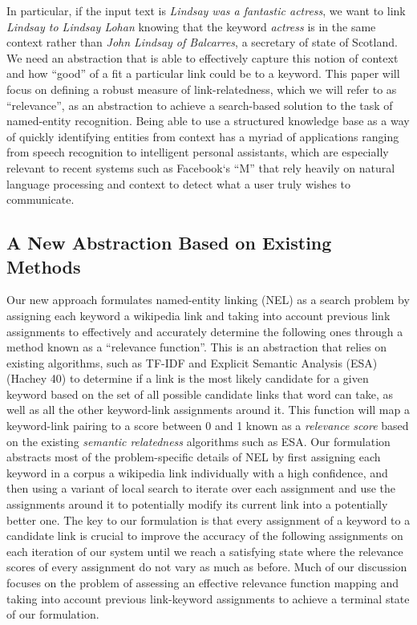 \documentclass[twoside,11pt]{article}
\begin{document}
In particular, if the input text is \textit{Lindsay was a fantastic actress}, we want to link \textit{Lindsay to Lindsay Lohan} knowing that the keyword \textit{actress} is in the same context rather than \textit{John Lindsay of Balcarres}, a secretary of state of Scotland. We need an abstraction that is able to effectively capture this notion of context and how ``good'' of a fit a particular link could be to a keyword. This paper will focus on defining a robust measure of link-relatedness, which we will refer to as ``relevance'', as an abstraction to achieve a search-based solution to the task of named-entity recognition. Being able to use a structured knowledge base as a way of quickly identifying entities from context has a myriad of applications ranging from speech recognition to intelligent personal assistants, which are especially relevant to recent systems such as Facebook`s ``M'' that rely heavily on natural language processing and context to detect what a user truly wishes to communicate.

\subsection{A New Abstraction Based on Existing Methods}


Our new approach formulates named-entity linking (NEL) as a search problem by assigning each keyword a wikipedia link and taking into account previous link assignments to effectively and accurately determine the following ones through a method known as a ``relevance function''. This is an abstraction that relies on existing algorithms, such as TF-IDF and Explicit Semantic Analysis (ESA) (Hachey 40) to determine if a link is the most likely candidate for a given keyword based on the set of all possible candidate links that word can take, as well as all the other keyword-link assignments around it. This function will map a keyword-link pairing to a score between 0 and 1 known as a \textit{relevance score} based on the existing \textit{semantic relatedness} algorithms such as ESA. Our formulation abstracts most of the problem-specific details of NEL by first assigning each keyword in a corpus a wikipedia link individually with a high confidence, and then using a variant of local search to iterate over each assignment and use the assignments around it to potentially modify its current link into a potentially better one. The key to our formulation is that every assignment of a keyword to a candidate link is crucial to improve the accuracy of the following assignments on each iteration of our system until we reach a satisfying state where the relevance scores of every assignment do not vary as much as before. Much of our discussion focuses on the problem of assessing an effective relevance function mapping and taking into account previous link-keyword assignments to achieve a terminal state of our formulation.
\end{document}
